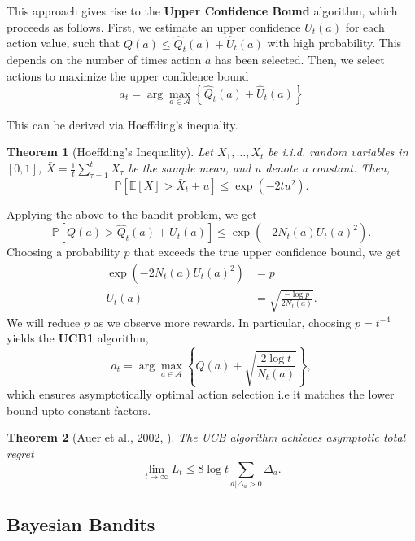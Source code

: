 \documentclass{article}
\newtheorem{theorem}{Theorem}
\newcommand{\E}{\mathbb{E}}                                        %
\begin{document}
This approach gives rise to the \textbf{Upper Confidence Bound} algorithm, which proceeds as follows. First, we estimate an upper confidence $\hat{U}_t(a)$ for each action value, such that $Q(a) \leq \hat{Q}_t(a) + \hat{U}_t(a)$ with high probability. This depends on the number of times action $a$ has been selected. Then, we select actions to maximize the upper confidence bound
\begin{equation}
    a_t =\arg\max_{a \in \mathcal{A}} \left\{ \hat{Q}_t(a) + \hat{U}_t(a) \right\}
\end{equation}

This can be derived via Hoeffding's inequality.
\begin{theorem}[Hoeffding's Inequality]
Let $X_1, \ldots, X_t$ be i.i.d. random variables in $[0,1]$, $\bar{X} = \frac{1}{t} \sum_{\tau = 1}^t X_{\tau}$ be the sample mean, and $u$ denote a constant. Then,
\begin{equation*}
    \mathbb{P}[\E[X] > \bar{X}_t + u] \leq \exp(-2 t u^2).
\end{equation*}
\end{theorem}
Applying the above to the bandit problem, we get
\begin{equation}
    \mathbb{P}[Q(a) > \hat{Q}_t(a) + U_t(a)] \leq \exp(-2 N_t(a) U_t(a)^2).
\end{equation}
Choosing a probability $p$ that exceeds the true upper confidence bound, we get
\begin{align}
    \exp(-2 N_t(a) U_t(a)^2) &= p\\
    U_t(a) &= \sqrt{\frac{-\log p}{2 N_t(a)}}.
\end{align}
We will reduce $p$ as we observe more rewards. In particular, choosing $p = t^{-4}$ yields the \textbf{UCB1} algorithm,
\begin{equation}
    a_t = \arg \max_{a \in \mathcal{A}} \left\{ Q(a) + \sqrt{\frac{2 \log t}{N_t(a)}} \right\},
\end{equation}
which ensures asymptotically optimal action selection i.e it matches the \cite{lai} lower bound upto constant factors.

\begin{theorem}[Auer et al., 2002, \cite{auer}]
The UCB algorithm achieves asymptotic total regret
\begin{equation*}
    \lim_{t \to \infty} L_t \leq 8 \log t \sum_{a | \Delta_a > 0} \Delta_a.
\end{equation*}
\end{theorem}

\subsection{Bayesian Bandits}
\end{document}
